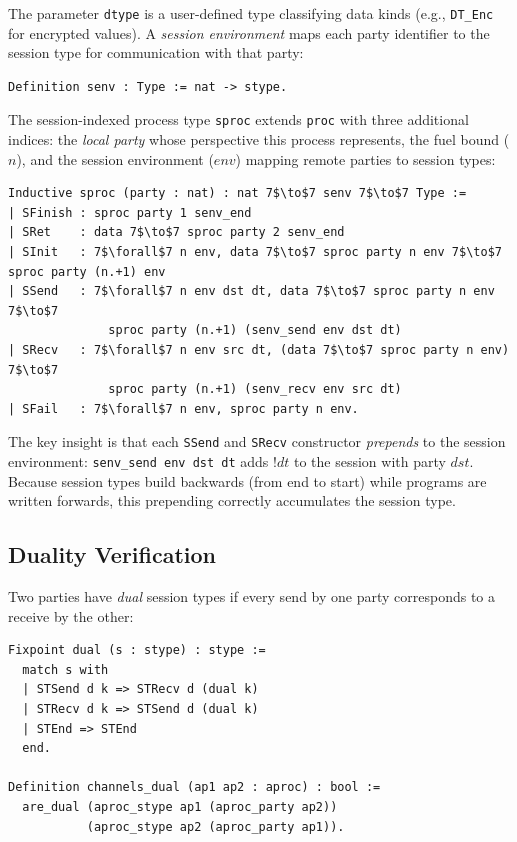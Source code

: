 \documentclass[11pt]{article}
\newcommand{\coqin}[1]{\texttt{#1}}
\begin{document}
The parameter \coqin{dtype} is a user-defined type classifying data kinds
(e.g., \coqin{DT\_Enc} for encrypted values). A \emph{session environment}
maps each party identifier to the session type for communication with that
party:

\begin{verbatim}
Definition senv : Type := nat -> stype.
\end{verbatim}

The session-indexed process type \coqin{sproc} extends \coqin{proc} with
three additional indices: the \emph{local party} whose
perspective this process represents, the fuel bound ($n$), and the
session environment ($\mathit{env}$) mapping remote parties to session types:

\begin{verbatim}
Inductive sproc (party : nat) : nat 7$\to$7 senv 7$\to$7 Type :=
| SFinish : sproc party 1 senv_end
| SRet    : data 7$\to$7 sproc party 2 senv_end
| SInit   : 7$\forall$7 n env, data 7$\to$7 sproc party n env 7$\to$7 sproc party (n.+1) env
| SSend   : 7$\forall$7 n env dst dt, data 7$\to$7 sproc party n env 7$\to$7
              sproc party (n.+1) (senv_send env dst dt)
| SRecv   : 7$\forall$7 n env src dt, (data 7$\to$7 sproc party n env) 7$\to$7
              sproc party (n.+1) (senv_recv env src dt)
| SFail   : 7$\forall$7 n env, sproc party n env.
\end{verbatim}

The key insight is that each \coqin{SSend} and \coqin{SRecv} constructor
\emph{prepends} to the session environment: \coqin{senv\_send env dst dt}
adds $\mathsf{!}dt$ to the session with party $\mathit{dst}$.
Because session types build backwards (from end to start) while programs
are written forwards, this prepending correctly accumulates the session type.

\subsection{Duality Verification}

Two parties have \emph{dual} session types if every send by one party
corresponds to a receive by the other:

\begin{verbatim}
Fixpoint dual (s : stype) : stype :=
  match s with
  | STSend d k => STRecv d (dual k)
  | STRecv d k => STSend d (dual k)
  | STEnd => STEnd
  end.

Definition channels_dual (ap1 ap2 : aproc) : bool :=
  are_dual (aproc_stype ap1 (aproc_party ap2))
           (aproc_stype ap2 (aproc_party ap1)).
\end{verbatim}
\end{document}
